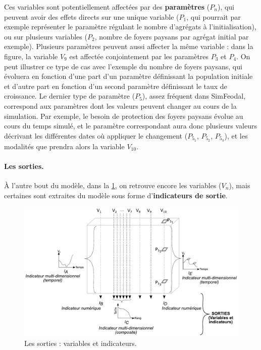 Ces variables sont potentiellement affectées par des \textbf{paramètres} ($P_n$), qui peuvent avoir des effets directs sur une unique variable ($P_1$, qui pourrait par exemple représenter le paramètre régulant le nombre d'agrégats à l'initialisation), ou sur plusieurs variables ($P_2$, nombre de foyers paysans par agrégat initial par exemple).
Plusieurs paramètres peuvent aussi affecter la même variable : dans la figure, la variable $V_9$ est affectée conjointement par les paramètres $P_3$ et $P_4$.
On peut illustrer ce type de cas avec l'exemple du nombre de foyers paysans, qui évoluera en fonction d'une part d'un paramètre définissant la population initiale et d'autre part en fonction d'un second paramètre définissant le taux de croissance.
Le dernier type de paramètre ($P_5$), assez fréquent dans SimFeodal, correspond aux paramètres dont les valeurs peuvent changer au cours de la simulation.
Par exemple, le besoin de protection des foyers paysans évolue au cours du temps simulé, et le paramètre correspondant aura donc plusieurs valeurs décrivant les différentes dates où appliquer le changement ($P_{5_1}$, $P_{5_2}$, $P_{5_3}$), et les modalités que prendra alors la variable $V_{10}$.


\paragraph{Les sorties.}
À l'autre bout du modèle, dans la \cref{fig:parametres-these-sorties}, on retrouve encore les variables ($V_n$), mais certaines sont extraites du modèle sous forme d'\textbf{indicateurs de sortie}.

\begin{figure}[H]
	\includegraphics[width=\linewidth]{img/schemas_params_2_sorties.pdf}
	\caption{Les sorties : variables et indicateurs.} 
	\label{fig:parametres-these-sorties} 
\end{figure}

